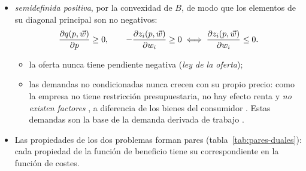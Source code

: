 \documentclass[11pt]{article}
\begin{document}
\begin{itemize}
\begin{itemize}
\begin{itemize}
      \item $\dfrac{\partial^2B}{\partial w_i\,\partial p}=\dfrac{\partial^2B}{\partial p\,\partial w_i}\iff-\dfrac{\partial z_i(p,\vect{w})}{\partial p}=\dfrac{\partial q(p,\vect{w})}{\partial w_i}$: el efecto del precio de un factor sobre la oferta es igual, y de signo contrario, al del precio del producto sobre la demanda de ese factor;
      \end{itemize}
    \item \emph{semidefinida positiva}, por la convexidad de $B$, de modo que los elementos de su diagonal principal son no negativos:
      \begin{equation}
      \frac{\partial q(p,\vec{w})}{\partial p}\geq 0,\qquad -\frac{\partial z_i(p,\vec{w})}{\partial w_i}\geq 0\iff\frac{\partial z_i(p,\vec{w})}{\partial w_i}\leq 0. \label{eq:ley-oferta}
      \end{equation}
      \begin{itemize}
      \item la oferta nunca tiene pendiente negativa (\emph{ley de la oferta});
      \item las demandas no condicionadas nunca crecen con su propio precio: como la empresa no tiene restricción presupuestaria, no hay efecto renta y \emph{no existen factores }, a diferencia de los bienes del consumidor . Estas demandas son la base de la demanda derivada de trabajo .
      \end{itemize}
    \end{itemize}
\end{itemize}

\begin{itemize}
\item Las propiedades de los dos problemas forman pares (tabla~\ref{tab:pares-duales}): cada propiedad de la función de beneficio tiene su correspondiente en la función de costes.
\end{itemize}
\end{document}
